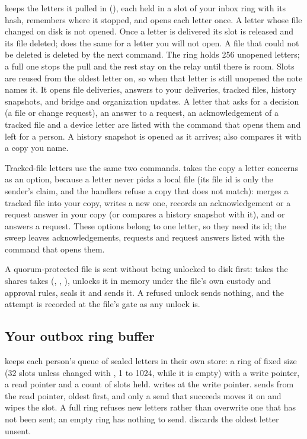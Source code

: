  keeps the letters it pulled in  (),
each held in a slot of your inbox ring with its hash, remembers where it
stopped, and opens each letter once. A letter whose file changed on disk is not
opened. Once a letter is delivered its slot is released and its file deleted;
 does the same for a letter you will not open. A file that
could not be deleted is deleted by the next  command. The ring
holds 256 unopened letters; a full one stops the pull and the rest stay on the
relay until there is room. Slots are reused from the oldest letter on, so when
that letter is still unopened the note names it. It opens file deliveries, answers
to your deliveries, tracked files, history snapshots, and bridge and
organization updates. A letter that asks for a decision (a file or change
request), an answer to a request, an acknowledgement of a tracked file and a
device letter are listed with the command that opens them and left for a person.
A history snapshot is opened as it arrives;  also compares it with
a copy you name.

Tracked-file letters use the same two commands.  takes the
copy a letter concerns as an option, because a letter never picks a local file
(its file id is only the sender's claim, and the handlers refuse a copy that
does not match):  merges a tracked file into your copy,
 writes a new one,  records an acknowledgement or a
request answer in your copy (or compares a history snapshot with it), and
 or  answers a request. These options belong to
one letter, so they need its id; the sweep leaves acknowledgements, requests
and request answers listed with the command that opens them.

A quorum-protected file is sent without being unlocked to disk first:
 takes the shares 
takes (, , ),
unlocks it in memory under the file's own custody and approval rules, seals
it and sends it. A refused unlock sends nothing, and the attempt is recorded
at the file's gate as any unlock is.

\subsection{Your outbox ring buffer}

 keeps each person's queue of sealed letters in their
own store: a ring of fixed size (32 slots unless changed with
, 1 to 1024, while it is empty) with a write pointer,
a read pointer and a count of slots held. 
writes at the write pointer.  sends from the read pointer,
oldest first, and only a send that succeeds moves it on and wipes the slot.
A full ring refuses new letters rather than overwrite one that has not been
sent; an empty ring has nothing to send.  discards the
oldest letter unsent.

